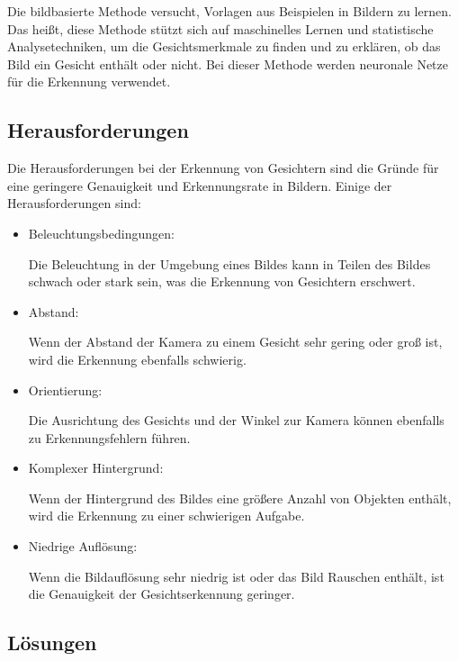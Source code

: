 Die bildbasierte Methode versucht, Vorlagen aus Beispielen in Bildern zu lernen. Das heißt, diese Methode stützt sich auf maschinelles Lernen und statistische Analysetechniken, um die Gesichtsmerkmale zu finden und zu erklären, ob das Bild ein Gesicht enthält oder nicht. Bei dieser Methode werden neuronale Netze für die Erkennung verwendet. 



\subsection{Herausforderungen}

Die Herausforderungen bei der Erkennung von Gesichtern sind die Gründe für eine geringere Genauigkeit und Erkennungsrate in Bildern. Einige der Herausforderungen sind:

\begin{itemize}
	\item Beleuchtungsbedingungen: 
	
	Die Beleuchtung in der Umgebung eines Bildes kann in Teilen des Bildes schwach oder stark sein, was die Erkennung von Gesichtern erschwert.
	\item Abstand: 
	
	Wenn der Abstand der Kamera zu einem Gesicht sehr gering oder groß ist, wird die Erkennung ebenfalls schwierig.
	\item Orientierung: 
	
	Die Ausrichtung des Gesichts und der Winkel zur Kamera können ebenfalls zu Erkennungsfehlern führen.
	\item Komplexer Hintergrund: 
	
	Wenn der Hintergrund des Bildes eine größere Anzahl von Objekten enthält, wird die Erkennung zu einer schwierigen Aufgabe.
	\item Niedrige Auflösung: 
	
	Wenn die Bildauflösung sehr niedrig ist oder das Bild Rauschen enthält, ist die Genauigkeit der Gesichtserkennung geringer.
\end{itemize}

\subsection{Lösungen}

